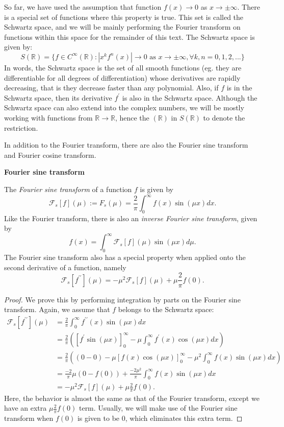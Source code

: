 So far, we have used the assumption that function $f(x) \to 0$ as $x \to \pm\infty$. There is a special set of functions where this property is true. This set is called the Schwartz space, and we will be mainly performing the Fourier transform on functions within this space for the remainder of this text.
The Schwartz space is given by:
$$S(\mathbb{R}) = \{ f \in C^\infty(\mathbb{R}) : |x^kf^n(x)|\to 0 \text{ as } x\to \pm\infty, \forall k,n = 0, 1, 2,... \} $$
In words, the Schwartz space is the set of all smooth functions (eg. they are differentiable for all degrees of differentiation)  whose derivatives are rapidly decreasing, that is they decrease faster than any polynomial. Also, if $f$ is in the Schwartz space, then its derivative $f^\prime$ is also in the Schwartz space.
Although the Schwartz space can also extend into the complex numbers, we will be mostly working with functions from $\mathbb{R} \to \mathbb{R}$, hence the $(\mathbb{R})$ in $S(\mathbb{R})$ to denote the restriction.

In addition to the Fourier transform, there are also the Fourier sine transform and Fourier cosine transform.

\textbf{Fourier sine transform}

The \emph{Fourier sine transform} of a function $f$ is given by
$$ \mathcal{F}_s[f](\mu) := F_s(\mu) = \frac{2}{\pi} \int_{0}^{\infty} f(x) \sin(\mu x) dx. $$
Like the Fourier transform, there is also an \emph{inverse Fourier sine transform}, given by
$$f(x) = \int_{0}^{\infty} \mathcal{F}_s[f](\mu) \sin(\mu x) d\mu.$$
The Fourier sine transform also has a special property when applied onto the second derivative of a function, namely
$$\mathcal{F}_s[f^{\prime\prime}](\mu) = -\mu^2\mathcal{F}_s[f](\mu) + \mu\frac{2}{\pi}f(0).$$

\begin{proof}
	We prove this by performing integration by parts on the Fourier sine transform. Again, we assume that $f$ belongs to the Schwartz space:
	\begin{align*}
	\mathcal{F}_s[f^{\prime\prime}](\mu) &= \frac{2}{\pi} \int_{0}^{\infty} f^{\prime\prime}(x) \sin(\mu x) dx \\
	&= \frac{2}{\pi}\left(\left[f^{\prime} \sin(\mu x) \right]_{0}^{\infty} - \mu \int_{0}^{\infty} f^{\prime}(x) \cos(\mu x) dx \right)\\
	&= \frac{2}{\pi}\left((0-0)- \mu \left[f(x) \cos(\mu x) \right]_{0}^{\infty} - \mu^2
	\int_{0}^{\infty} f(x) \sin(\mu x) dx \right)\\
	&= \frac{-2}{\pi}\mu (0 - f(0)) + \frac{-2\mu^2}{\pi}
	\int_{0}^{\infty} f(x) \sin(\mu x) dx\\
	&= -\mu^2\mathcal{F}_s[f](\mu) + \mu\frac{2}{\pi}f(0).
	\end{align*}
	Here, the behavior is almost the same as that of the Fourier transform, except we have an extra  $\mu\frac{2}{\pi}f(0)$ term. Usually, we will make use of the Fourier sine transform when  $f(0)$ is given to be 0, which eliminates this extra term.
\end{proof}

